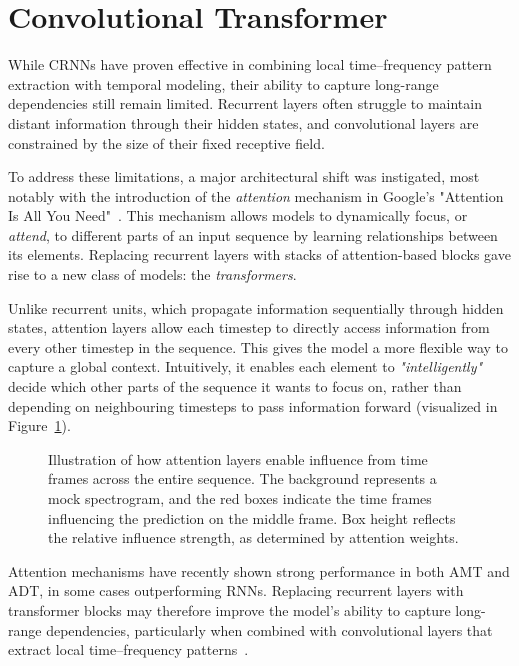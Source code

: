 \section{Convolutional Transformer}

While \glspl{CRNN} have proven effective in combining local time–frequency pattern extraction with temporal modeling, their ability to capture long-range dependencies still remain limited. Recurrent layers often struggle to maintain distant information through their hidden states, and convolutional layers are constrained by the size of their fixed receptive field.

To address these limitations, a major architectural shift was instigated, most notably with the introduction of the \textit{attention} mechanism in Google's "Attention Is All You Need"~\cite{NIPS2017_3f5ee243}. This mechanism allows models to dynamically focus, or \textit{attend}, to different parts of an input sequence by learning relationships between its elements. Replacing recurrent layers with stacks of attention-based blocks gave rise to a new class of models: the \textit{transformers}.

Unlike recurrent units, which propagate information sequentially through hidden states, attention layers allow each timestep to directly access information from every other timestep in the sequence. This gives the model a more flexible way to capture a global context. Intuitively, it enables each element to \textit{"intelligently"} decide which other parts of the sequence it wants to focus on, rather than depending on neighbouring timesteps to pass information forward (visualized in Figure~\ref{CTInfluenceFigure}).

\begin{figure}[H]
    \centering
    
    \caption{Illustration of how attention layers enable influence from time frames across the entire sequence. The background represents a mock spectrogram, and the red boxes indicate the time frames influencing the prediction on the middle frame. Box height reflects the relative influence strength, as determined by attention weights.}
    \label{CTInfluenceFigure}
\end{figure}

Attention mechanisms have recently shown strong performance in both \gls{AMT} and \gls{ADT}, in some cases outperforming \glspl{RNN}. Replacing recurrent layers with transformer blocks may therefore improve the model's ability to capture long-range dependencies, particularly when combined with convolutional layers that extract local time–frequency patterns~\cite{9747048, gardner2022mt3multitaskmultitrackmusic, signals4040042, chang2024yourmt3+, zehren2024analyzingreducingsynthetictorealtransfer}.

